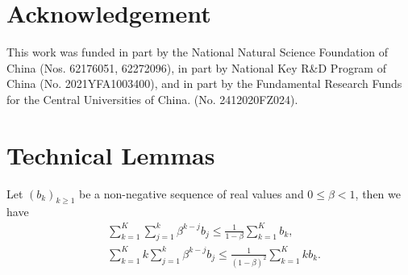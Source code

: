 \documentclass[twoside,11pt]{article}
\begin{document}
\section*{Acknowledgement}
This work was funded in part by the National Natural Science Foundation of China (Nos. 62176051, 62272096), in part by National Key R\&D Program of China (No. 2021YFA1003400), and in part by the Fundamental Research Funds for the Central Universities of China. (No. 2412020FZ024).








\newpage

\appendix
\section{Technical Lemmas}
\begin{lemma}\label{Lemsum}
Let $(b_k)_{k\ge 1}$ be a non-negative sequence of real values and  $0\le\beta<1$, then we have
\begin{align}
   	\label{Lemsum.1}
   	&\sum_{k=1}^{K}\sum_{j=1}^{k}\beta^{k-j}b_j\le\frac{1}{1-\beta}\sum_{k=1}^{K}b_k,\\
   	\label{Lemsum.2}
   	&\sum_{k=1}^{K}k\sum_{j=1}^{k}\beta^{k-j}b_j\le\frac{1}{(1-\beta)^2}\sum_{k=1}^{K}k b_k.
\end{align}
\end{lemma}
\end{document}
